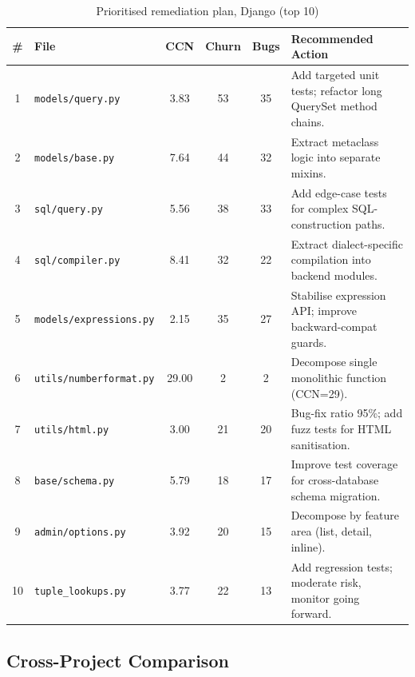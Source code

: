 \documentclass[12pt,a4paper]{article}
\begin{document}
\begin{table}[H]
\centering
\footnotesize
\caption{Prioritised remediation plan, Django (top 10)}
\label{tab:plan_django}
\begin{tabular}{cl c c c p{5cm}}
\toprule
\textbf{\#} & \textbf{File} & \textbf{CCN} & \textbf{Churn} & \textbf{Bugs} & \textbf{Recommended Action} \\
\midrule
1 & \texttt{models/query.py}       & 3.83 & 53 & 35 & Add targeted unit tests; refactor long QuerySet method chains. \\
2 & \texttt{models/base.py}        & 7.64 & 44 & 32 & Extract metaclass logic into separate mixins. \\
3 & \texttt{sql/query.py}          & 5.56 & 38 & 33 & Add edge-case tests for complex SQL-construction paths. \\
4 & \texttt{sql/compiler.py}       & 8.41 & 32 & 22 & Extract dialect-specific compilation into backend modules. \\
5 & \texttt{models/expressions.py} & 2.15 & 35 & 27 & Stabilise expression API; improve backward-compat guards. \\
6 & \texttt{utils/numberformat.py}  & 29.00& 2  & 2  & Decompose single monolithic function (CCN=29). \\
7 & \texttt{utils/html.py}         & 3.00 & 21 & 20 & Bug-fix ratio 95\%; add fuzz tests for HTML sanitisation. \\
8 & \texttt{base/schema.py}        & 5.79 & 18 & 17 & Improve test coverage for cross-database schema migration. \\
9 & \texttt{admin/options.py}      & 3.92 & 20 & 15 & Decompose by feature area (list, detail, inline). \\
10& \texttt{tuple\_lookups.py}     & 3.77 & 22 & 13 & Add regression tests; moderate risk, monitor going forward. \\
\bottomrule
\end{tabular}
\end{table}

\FloatBarrier
\subsection{Cross-Project Comparison}
\end{document}
